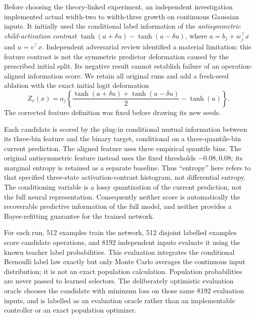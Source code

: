 Before choosing the theory-linked experiment, an independent investigation
implemented actual width-two to width-three growth on continuous Gaussian
inputs. It initially used the conditional label information of the
\emph{antisymmetric child-activation contrast}
$\tanh(a+\delta u)-\tanh(a-\delta u)$, where
$a=b_j+w_j^\top x$ and $u=v^\top x$.
Independent adversarial review identified a material limitation: this feature
contrast is not the symmetric predictor deformation caused by the prescribed
initial split. Its negative result cannot establish failure of an
operation-aligned information score. We retain all original runs and add a
fresh-seed ablation with the exact initial logit deformation
\[
 Z_v(x)=a_j\left\{\frac{\tanh(a+\delta u)+\tanh(a-\delta u)}2-\tanh(a)\right\}.
\]
The corrected feature definition was fixed before drawing its new seeds.

Each candidate is scored by the plug-in conditional mutual information between
its three-bin feature and the binary target, conditional on a three-quantile-bin
current prediction. The aligned feature uses three empirical quantile bins.
The original antisymmetric feature instead uses the fixed thresholds
$-0.08,0.08$; its marginal entropy is retained as a separate baseline. Thus
``entropy'' here refers to that specified three-state activation-contrast
histogram, not differential entropy. The conditioning variable is a lossy
quantization of the current prediction, not the full neural representation.
Consequently neither score is automatically the recoverable predictive
information of the full model, and neither provides a Bayes-refitting guarantee
for the trained network.

For each run, 512 examples train the network, 512 disjoint labelled examples
score candidate operations, and 8192 independent inputs evaluate it using the
known teacher label probabilities. This evaluation integrates the conditional
Bernoulli label law exactly but only Monte Carlo averages the continuous input
distribution; it is not an exact population calculation. Population probabilities
are never passed to learned selectors. The deliberately optimistic evaluation
oracle chooses the candidate with minimum loss on those same 8192 evaluation
inputs, and is labelled as an evaluation oracle rather than an implementable
controller or an exact population optimizer.

